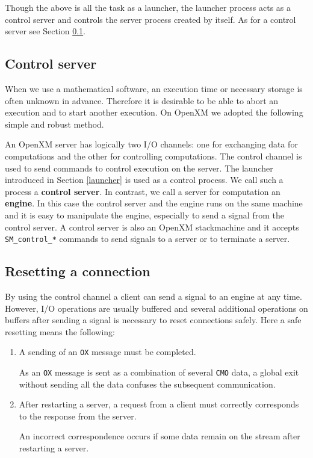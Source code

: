 Though the above is all the task as a launcher, the launcher process
acts as a control server and controls the server process created by
itself. As for a control server see Section \ref{control}.

\subsection{Control server}
\label{control}
When we use a mathematical software, an execution time or necessary
storage is often unknown in advance. Therefore it is desirable
to be able to abort an execution and to start another execution.
On OpenXM we adopted the following simple and robust method.

An OpenXM server has logically two I/O channels: one for exchanging
data for computations and the other for controlling computations. The
control channel is used to send commands to control execution on the
server. The launcher introduced in Section \ref{launcher}
is used as a control process. We call such a process a {\bf
control server}. In contrast, we call a server for computation an {\bf
engine}. In this case the control server and the engine runs on the
same machine and it is easy to manipulate the engine, especially to
send a signal from the control server. A control server is also an
OpenXM stackmachine and it accepts {\tt SM\_control\_*} commands
to send signals to a server or to terminate a server.

\subsection{Resetting a connection}

By using the control channel a client can send a signal to an engine
at any time. However, I/O operations are usually buffered and several
additional operations on buffers after sending a signal is necessary
to reset connections safely. Here a safe resetting means the
following:

\begin{enumerate}
\item A sending of an {\tt OX} message must be completed.

As an {\tt OX} message is sent as a combination of several {\tt CMO}
data, a global exit without sending all the data confuses the
subsequent communication.

\item After restarting a server, a request from a client 
must correctly corresponds to the response from the server.

An incorrect correspondence occurs if some data remain on the stream
after restarting a server.
\end{enumerate}

